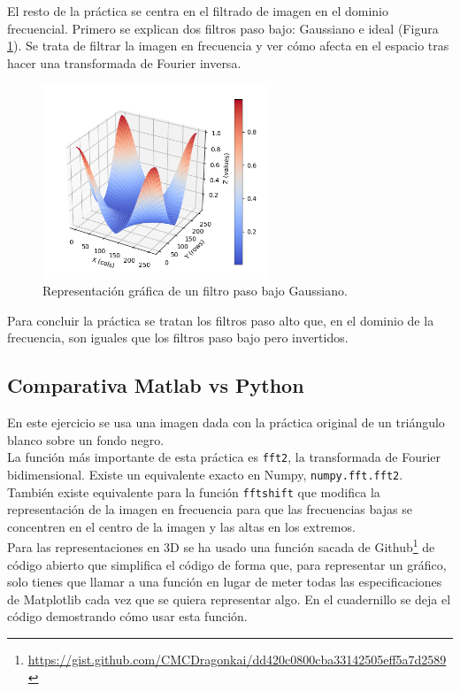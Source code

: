 El resto de la práctica se centra en el filtrado de imagen en el dominio frecuencial. Primero se explican dos filtros paso bajo: Gaussiano e ideal (Figura \ref {gauss}). Se trata de filtrar la imagen en frecuencia y ver cómo afecta en el espacio tras hacer una transformada de Fourier inversa.\\
\begin{figure}[h]
\centering
\includegraphics[width=0.6\textwidth]{imagenes/gaussfpb}
\caption{Representación gráfica de un filtro paso bajo Gaussiano.}
\label{gauss}
\end{figure}

 Para concluir la práctica se tratan los filtros paso alto que, en el dominio de la frecuencia, son iguales que los filtros paso bajo pero invertidos.
\subsection{Comparativa Matlab vs Python}

En este ejercicio se usa una imagen dada con la práctica original de un triángulo blanco sobre un fondo negro.\\

La función más importante de esta práctica es \texttt{fft2}, la transformada de Fourier bidimensional. Existe un equivalente exacto en Numpy,  \texttt{numpy.fft.fft2}. También existe equivalente para la función \texttt{fftshift} que modifica la representación de la imagen en frecuencia para que las frecuencias bajas se concentren en el centro de la imagen y las altas en los extremos.\\

Para las representaciones en 3D se ha usado una función sacada de Github\footnote{\url{https://gist.github.com/CMCDragonkai/dd420c0800cba33142505eff5a7d2589}} de código abierto que simplifica el código de forma que, para representar un gráfico, solo tienes que llamar a una función en lugar de meter todas las especificaciones de Matplotlib cada vez que se quiera representar algo. En el cuadernillo se deja el código demostrando cómo usar esta función.\\

